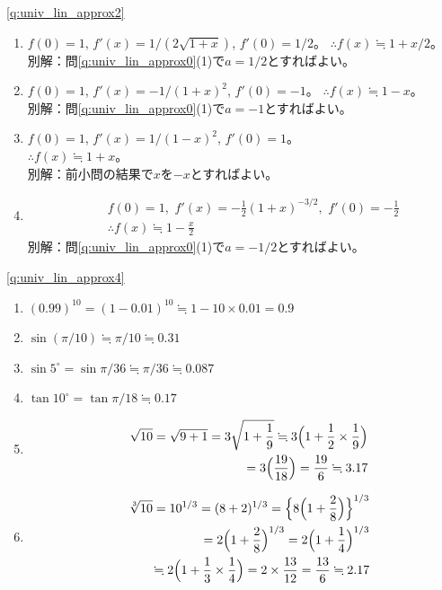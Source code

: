 %
\ref{q:univ_lin_approx2}  \
\begin{enumerate}
\item $f(0)=1$, 
       $f'(x)=1/(2\sqrt{1+x})$, $f'(0)=1/2$。
       $\therefore f(x)\fallingdotseq 1+x/2$。\\
別解：問\ref{q:univ_lin_approx0}(1)で$a=1/2$とすればよい。
\hv
\item $f(0)=1$, 
       $f'(x)=-1/(1+x)^2$, $f'(0)=-1$。
       $\therefore f(x)\fallingdotseq 1-x$。\\
別解：問\ref{q:univ_lin_approx0}(1)で$a=-1$とすればよい。
\hv
\item $f(0)=1$, 
       $f'(x)=1/(1-x)^2$, $f'(0)=1$。\\
       $\therefore f(x)\fallingdotseq 1+x$。\\
別解：前小問の結果で$x$を$-x$とすればよい。
\hv
\item  
\begin{eqnarray*}
&&f(0)=1,\,\, f'(x)=-\frac{1}{2}(1+x)^{-3/2},\,\, f'(0)=-\frac{1}{2}\\
&&\therefore f(x)\fallingdotseq 1-\frac{x}{2}
\end{eqnarray*}
別解：問\ref{q:univ_lin_approx0}(1)で$a=-1/2$とすればよい。
\end{enumerate}
\hv

% 
\ref{q:univ_lin_approx4} 
\begin{enumerate}
\item $(0.99)^{10}=(1-0.01)^{10} \fallingdotseq 1-10 \times 0.01=0.9$
\item $\sin (\pi/10) \fallingdotseq \pi/10 \fallingdotseq 0.31$
\item $\sin 5^{\circ} = \sin \pi/36 \fallingdotseq \pi/36 \fallingdotseq 0.087$
\item $\tan 10^{\circ} =\tan \pi/18 \fallingdotseq 0.17$
\item 
\begin{eqnarray*}
&&\sqrt{10} =\sqrt{9+1} =3\sqrt{1+\frac{1}{9}} \fallingdotseq 3\Bigl(1+\frac{1}{2}\times\frac{1}{9}\Bigr)\\
&&=3\Bigl(\frac{19}{18}\Bigr)=\frac{19}{6} \fallingdotseq 3.17
\end{eqnarray*}
\item
\begin{eqnarray*}
&&\sqrt[3]{10}=10^{1/3}=(8+2)^{1/3}=\Bigl\{8\Bigl(1+\frac{2}{8}\Bigr)\Bigr\}^{1/3}\\
&&=2\Bigl(1+\frac{2}{8}\Bigr)^{1/3}=2\Bigl(1+\frac{1}{4}\Bigr)^{1/3}\\
&&\fallingdotseq 2\Bigl(1+\frac{1}{3}\times\frac{1}{4}\Bigr)=2\times \frac{13}{12}=\frac{13}{6}\fallingdotseq 2.17
\end{eqnarray*}
\end{enumerate}
\hv






